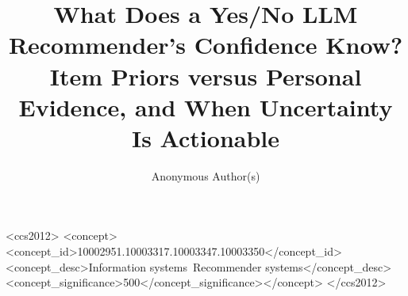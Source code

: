 \documentclass[sigconf,natbib=true,anonymous=true]{acmart}
\begin{document}
\title{What Does a Yes/No LLM Recommender's Confidence Know?\\
Item Priors versus Personal Evidence, and When Uncertainty Is Actionable}

\author{Anonymous Author(s)}

\begin{abstract}

\end{abstract}

\begin{CCSXML}
<ccs2012>
<concept><concept_id>10002951.10003317.10003347.10003350</concept_id>
<concept_desc>Information systems~Recommender systems</concept_desc><concept_significance>500</concept_significance></concept>
</ccs2012>
\end{CCSXML}

\maketitle









\appendix




\end{document}
